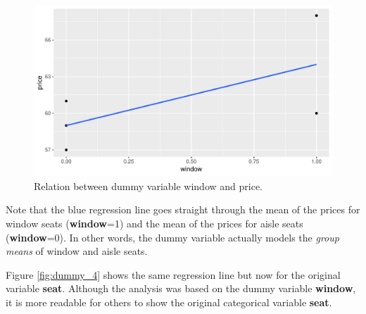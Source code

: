 \documentclass[]{book}\usepackage[]{graphicx}\usepackage[]{color}
\makeatletter
\def\maxwidth{ %
  \ifdim\Gin@nat@width>\linewidth
    \linewidth
  \else
    \Gin@nat@width
  \fi
}
\newenvironment{knitrout}{}{} %
\makeatother
\begin{document}
\begin{knitrout}
\color{fgcolor}\begin{figure}

{\centering \includegraphics[width=\maxwidth]{figure/dummy_3-1} 

}

\caption[Relation between dummy variable window and price]{Relation between dummy variable window and price.}\label{fig:dummy_3}
\end{figure}


\end{knitrout}


Note that the blue regression line goes straight through the mean of the prices for window seats (\textbf{window}=1) and the mean of the prices for aisle seats (\textbf{window}=0). In other words, the dummy variable actually models the \textit{group means} of window and aisle seats.

Figure \ref{fig:dummy_4} shows the same regression line but now for the original variable \textbf{seat}. Although the analysis was based on the dummy variable \textbf{window}, it is more readable for others to show the original categorical variable \textbf{seat}.
\end{document}
